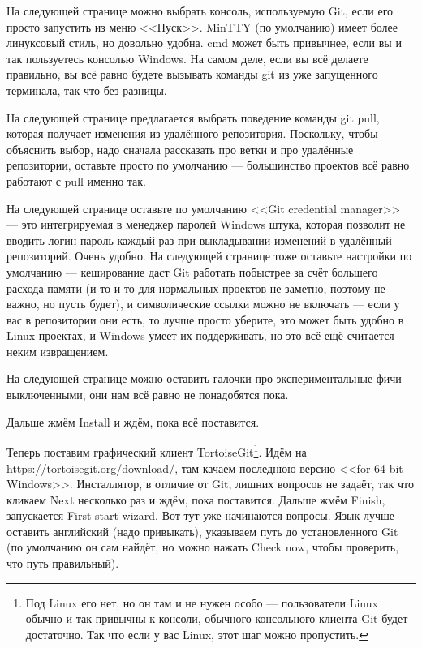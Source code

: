 \documentclass{../text-style}
\begin{document}
На следующей странице можно выбрать консоль, используемую Git, если его просто запустить из меню <<Пуск>>. MinTTY (по умолчанию) имеет более линуксовый стиль, но довольно удобна. cmd может быть привычнее, если вы и так пользуетесь консолью Windows. На самом деле, если вы всё делаете правильно, вы всё равно будете вызывать команды git из уже запущенного терминала, так что без разницы.

На следующей странице предлагается выбрать поведение команды git pull, которая получает изменения из удалённого репозитория. Поскольку, чтобы объяснить выбор, надо сначала рассказать про ветки и про удалённые репозитории, оставьте просто по умолчанию --- большинство проектов всё равно работают с pull именно так.

На следующей странице оставьте по умолчанию <<Git credential manager>> --- это интегрируемая в менеджер паролей Windows штука, которая позволит не вводить логин-пароль каждый раз при выкладывании изменений в удалённый репозиторий. Очень удобно. На следующей странице тоже оставьте настройки по умолчанию --- кеширование даст Git работать побыстрее за счёт большего расхода памяти (и то и то для нормальных проектов не заметно, поэтому не важно, но пусть будет), и символические ссылки можно не включать --- если у вас в репозитории они есть, то лучше просто уберите, это может быть удобно в Linux-проектах, и Windows умеет их поддерживать, но это всё ещё считается неким извращением.

На следующей странице можно оставить галочки про экспериментальные фичи выключенными, они нам всё равно не понадобятся пока.

Дальше жмём Install и ждём, пока всё поставится.

Теперь поставим графический клиент TortoiseGit\footnote{Под Linux его нет, но он там и не нужен особо --- пользователи Linux обычно и так привычны к консоли, обычного консольного клиента Git будет достаточно. Так что если у вас Linux, этот шаг можно пропустить.}. Идём на \url{https://tortoisegit.org/download/}, там качаем последнюю версию <<for 64-bit Windows>>. Инсталлятор, в отличие от Git, лишних вопросов не задаёт, так что кликаем Next несколько раз и ждём, пока поставится. Дальше жмём Finish, запускается First start wizard. Вот тут уже начинаются вопросы. Язык лучше оставить английский (надо привыкать), указываем путь до установленного Git (по умолчанию он сам найдёт, но можно нажать Check now, чтобы проверить, что путь правильный). 
\end{document}
